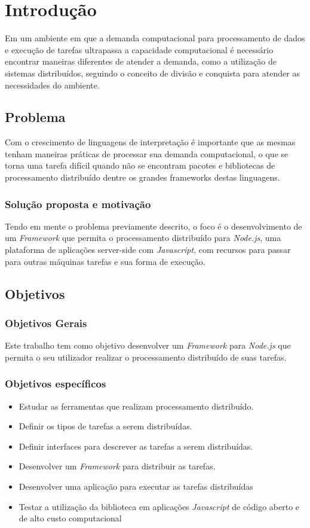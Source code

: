 
\chapter{Introdução}
\label{introducao}

Em um ambiente em que a demanda computacional para processamento de dados e
execução de tarefas ultrapassa a capacidade computacional é necessário encontrar
maneiras diferentes de atender a demanda, como a utilização de sistemas
distribuídos, seguindo o conceito de divisão e conquista para atender as
necessidades do ambiente.

\section{Problema}
Com o crescimento de linguagens de interpretação é
importante que as mesmas tenham maneiras práticas de processar sua demanda
computacional, o que se torna uma tarefa difícil quando não se encontram pacotes
e bibliotecas de processamento distribuído dentre os grandes frameworks destas
linguagens.

\subsection{Solução proposta e motivação}
Tendo em mente o problema previamente descrito, o foco é o desenvolvimento
de um \emph{Framework} que permita o processamento distribuído para \emph{Node.js}, uma
plataforma de aplicações server-side com \emph{Javascript}, com recursos para
passar para outras máquinas tarefas e sua forma de execução.

\section{Objetivos}
\label{objetivos}

\subsection{Objetivos Gerais}
Este trabalho tem como objetivo desenvolver um \emph{Framework} para \emph{Node.js} que
permita o seu utilizador realizar o processamento distribuído de suas tarefas.

\subsection{Objetivos específicos}
\begin{itemize}
  \item Estudar as ferramentas que realizam processamento distribuído.
  \item Definir os tipos de tarefas a serem distribuídas.
  \item Definir interfaces para descrever as tarefas a serem distribuídas.
  \item Desenvolver um \emph{Framework} para distribuir as tarefas.
  \item Desenvolver uma aplicação para executar as tarefas distribuídas
  \item Testar a utilização da biblioteca em aplicações \emph{Javascript} de código aberto
  e de alto custo computacional
\end{itemize}

